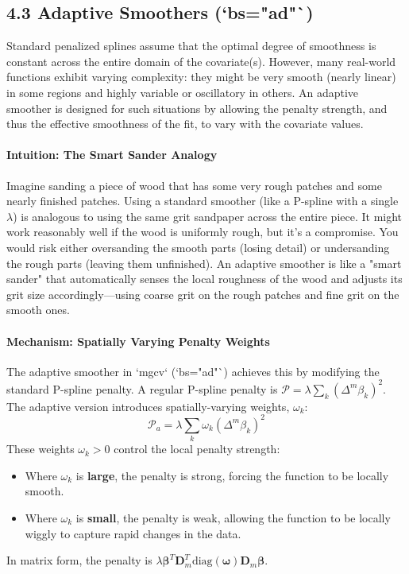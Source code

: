 \documentclass[11pt, a4paper]{article}
\begin{document}
\subsection{4.3 Adaptive Smoothers (`bs="ad"`)}
Standard penalized splines assume that the optimal degree of smoothness is constant across the entire domain of the covariate(s). However, many real-world functions exhibit varying complexity: they might be very smooth (nearly linear) in some regions and highly variable or oscillatory in others. An adaptive smoother is designed for such situations by allowing the penalty strength, and thus the effective smoothness of the fit, to vary with the covariate values.

\paragraph{Intuition: The Smart Sander Analogy}
Imagine sanding a piece of wood that has some very rough patches and some nearly finished patches. Using a standard smoother (like a P-spline with a single $\lambda$) is analogous to using the same grit sandpaper across the entire piece. It might work reasonably well if the wood is uniformly rough, but it's a compromise. You would risk either oversanding the smooth parts (losing detail) or undersanding the rough parts (leaving them unfinished). An adaptive smoother is like a "smart sander" that automatically senses the local roughness of the wood and adjusts its grit size accordingly—using coarse grit on the rough patches and fine grit on the smooth ones.

\paragraph{Mechanism: Spatially Varying Penalty Weights}
The adaptive smoother in `mgcv` (`bs="ad"`) achieves this by modifying the standard P-spline penalty. A regular P-spline penalty is $\mathcal{P} = \lambda \sum_{k} (\Delta^m \beta_k)^2$. The adaptive version introduces spatially-varying weights, $\omega_k$:
\[ \mathcal{P}_a = \lambda \sum_{k} \omega_k (\Delta^m \beta_k)^2 \]
These weights $\omega_k > 0$ control the local penalty strength:
\begin{itemize}
 \item Where $\omega_k$ is \textbf{large}, the penalty is strong, forcing the function to be locally smooth.
 \item Where $\omega_k$ is \textbf{small}, the penalty is weak, allowing the function to be locally wiggly to capture rapid changes in the data.
\end{itemize}
In matrix form, the penalty is $\lambda \boldsymbol{\beta}^T \mathbf{D}_m^T \text{diag}(\boldsymbol{\omega}) \mathbf{D}_m \boldsymbol{\beta}$.
\end{document}
